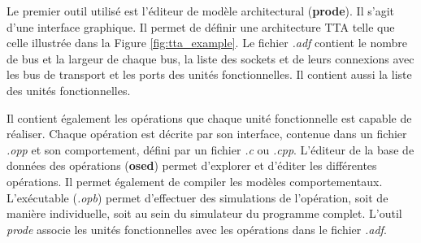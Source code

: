 Le premier outil utilisé est l'éditeur de modèle architectural (\textbf{prode}). Il s'agit d'une interface graphique. Il permet de définir une architecture TTA telle que celle illustrée dans la Figure \ref{fig:tta_example}. Le fichier \textit{.adf} contient le nombre de bus et la largeur de chaque bus, la liste des sockets et de leurs connexions avec les bus de transport et les ports des unités fonctionnelles. Il contient aussi la liste des unités fonctionnelles.

Il contient également les opérations que chaque unité fonctionnelle est capable de réaliser. Chaque opération est décrite par son interface, contenue dans un fichier \textit{.opp} et son comportement, défini par un fichier \textit{.c} ou \textit{.cpp}. L'éditeur de la base de données des opérations (\textbf{osed}) permet d'explorer et d'éditer les différentes opérations. Il permet également de compiler les modèles comportementaux. L'exécutable (\textit{.opb}) permet d'effectuer des simulations de l'opération, soit de manière individuelle, soit au sein du simulateur du programme complet. L'outil \textit{prode} associe les unités fonctionnelles avec les opérations dans le fichier \textit{.adf}.

